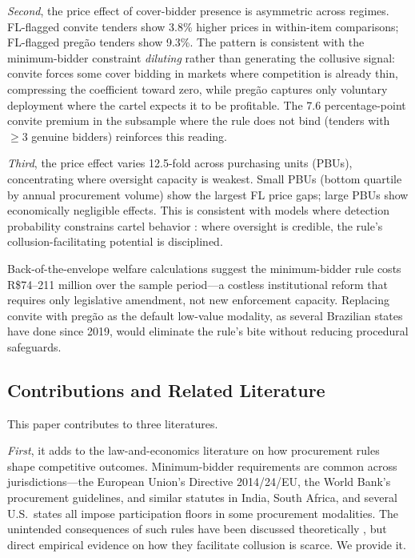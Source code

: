 \emph{Second}, the price effect of cover-bidder presence is
asymmetric across regimes. FL-flagged convite tenders show 3.8\%
higher prices in within-item comparisons; FL-flagged preg\~ao tenders
show 9.3\%. The pattern is consistent with the minimum-bidder
constraint \emph{diluting} rather than generating the collusive
signal: convite forces some cover bidding in markets where
competition is already thin, compressing the coefficient toward zero,
while preg\~ao captures only voluntary deployment where the cartel
expects it to be profitable. The 7.6 percentage-point convite premium
in the subsample where the rule does not bind (tenders with $\geq 3$
genuine bidders) reinforces this reading.

\emph{Third}, the price effect varies 12.5-fold across purchasing
units (PBUs), concentrating where oversight capacity is weakest.
Small PBUs (bottom quartile by annual procurement volume) show the
largest FL price gaps; large PBUs show economically negligible
effects. This is consistent with models where detection probability
constrains cartel behavior \citep{harrington2008detecting}: where
oversight is credible, the rule's collusion-facilitating potential is
disciplined.

Back-of-the-envelope welfare calculations suggest the minimum-bidder
rule costs R\$74--211 million over the sample period---a costless
institutional reform that requires only legislative amendment, not
new enforcement capacity. Replacing convite with preg\~ao as the
default low-value modality, as several Brazilian states have done
since 2019, would eliminate the rule's bite without reducing
procedural safeguards.

\subsection{Contributions and Related Literature}

This paper contributes to three literatures.

\emph{First}, it adds to the law-and-economics literature on how
procurement rules shape competitive outcomes. Minimum-bidder
requirements are common across jurisdictions---the European Union's
Directive 2014/24/EU, the World Bank's procurement guidelines, and
similar statutes in India, South Africa, and several U.S.\
states all impose participation floors in some procurement
modalities. The unintended consequences of such rules have been
discussed theoretically \citep{decarolis2014awarding}, but
direct empirical evidence on how they facilitate collusion is
scarce. We provide it.

